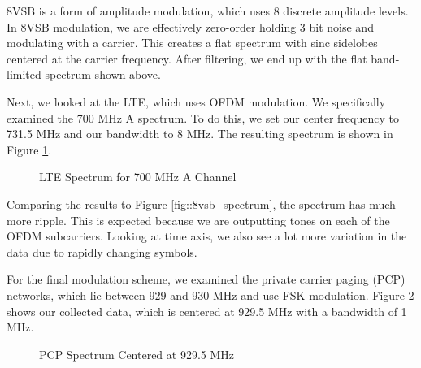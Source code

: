 \documentclass{article}
\begin{document}

8VSB is a form of amplitude modulation, which uses 8 discrete amplitude levels. In 8VSB modulation, we are effectively zero-order holding 3 bit noise and modulating with a carrier. This creates a flat spectrum with sinc sidelobes centered at the carrier frequency. After filtering, we end up with the flat band-limited spectrum shown above.
 
Next, we looked at the LTE, which uses OFDM modulation. We specifically examined the 700 MHz A spectrum. To do this, we set our center frequency to 731.5 MHz and our bandwidth to 8 MHz. The resulting spectrum is shown in Figure \ref{fig::lte_spectrum}.

\begin{figure}[H]
	\centerline{}
	\caption{LTE Spectrum for 700 MHz A Channel}
	\label{fig::lte_spectrum}
\end{figure}

Comparing the results to Figure \ref{fig::8vsb_spectrum}, the spectrum has much more ripple. This is expected because we are outputting tones on each of the OFDM subcarriers. Looking at time axis, we also see a lot more variation in the data due to rapidly changing symbols.

For the final modulation scheme, we examined the private carrier paging (PCP) networks, which lie between 929 and 930 MHz and use FSK modulation. Figure \ref{fig::930MHz_fsk_spectrum} shows our collected data, which is centered at 929.5 MHz with a bandwidth of 1 MHz.

\begin{figure}[H]
	\centerline{}
	\caption{PCP Spectrum Centered at 929.5 MHz}
	\label{fig::930MHz_fsk_spectrum}
\end{figure}
\end{document}
